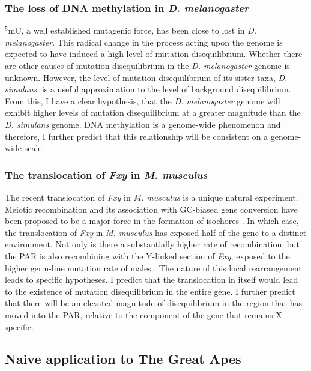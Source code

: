 \subsubsection{The loss of DNA methylation in \textit{D. melanogaster}}

$^5$mC, a well established mutagenic force, has been close to lost in \textit{D. melanogaster}. This radical change in the process acting upon the genome is expected to have induced a high level of mutation disequilibrium. Whether there are other causes of mutation disequilibrium in the \textit{D. melanogaster} genome is unknown. However, the level of mutation disequilibrium of its sister taxa, \textit{D. simulans}, is a useful approximation to the level of background disequilibrium. From this, I have a clear hypothesis, that the \textit{D. melanogaster} genome will exhibit higher levels of mutation disequilibrium at a greater magnitude than the \textit{D. simulans} genome. DNA methylation is a genome-wide phenomenon and therefore, I further predict that this relationship will be consistent on a genome-wide scale. 
 
\subsubsection{The translocation of \textit{Fxy} in \textit{M. musculus}}

The recent translocation of \textit{Fxy} in \textit{M. musculus} is a unique natural experiment. Meiotic recombination and its association with GC-biased gene conversion have been proposed to be a major force in the formation of isochores \citep{Montoya-Burgos2003RecombinationGenomes}. In which case, the translocation of \textit{Fxy} in \textit{M. musculus} has exposed half of the gene to a distinct environment. Not only is there a substantially higher rate of recombination, but the PAR is also recombining with the Y-linked section of \textit{Fxy}, exposed to the higher germ-line mutation rate of males \citep{Huttley2000HowMutagenesis}. The nature of this local rearrangement leads to specific hypotheses. I predict that the translocation in itself would lead to the existence of mutation disequilibrium in the entire gene. I further predict that there will be an elevated magnitude of disequilibrium in the region that has moved into the PAR, relative to the component of the gene that remains X-specific. 

\subsection{Naive application to The Great Apes}

